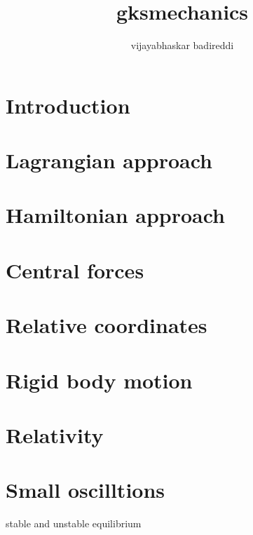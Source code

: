 \documentclass[12pt]{article}
\title{gksmechanics}
\author{vijayabhaskar badireddi}
\begin{document}
\maketitle

\section*{Introduction}
\section*{Lagrangian approach}
\section*{Hamiltonian approach}
\section*{Central forces}
\section*{Relative coordinates}
\section*{Rigid body motion}
\section*{Relativity}
\section*{Small oscilltions}
stable and unstable equilibrium
\end{document}
